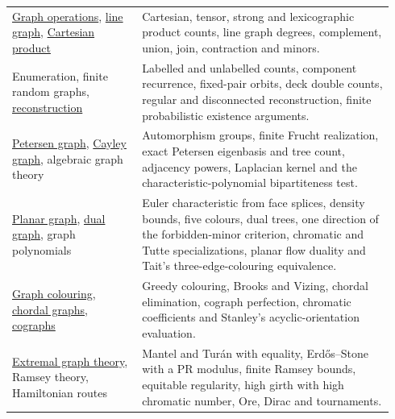 \begin{longtable}{@{} >{\raggedright\arraybackslash}p{0.32\linewidth}@{\hspace{0.04\linewidth}}p{0.62\linewidth}@{}}
\href{https://en.wikipedia.org/wiki/Graph_operations}{Graph operations},
\href{https://en.wikipedia.org/wiki/Line_graph}{line graph},
\href{https://en.wikipedia.org/wiki/Cartesian_product_of_graphs}{Cartesian product}
& Cartesian, tensor, strong and lexicographic product counts, line graph degrees, complement, union, join, contraction and minors.\\[4pt]
Enumeration, finite random graphs,
\href{https://en.wikipedia.org/wiki/Reconstruction_conjecture}{reconstruction}
& Labelled and unlabelled counts, component recurrence, fixed-pair orbits, deck double counts, regular and disconnected reconstruction, finite probabilistic existence arguments.\\[4pt]
\href{https://en.wikipedia.org/wiki/Petersen_graph}{Petersen graph},
\href{https://en.wikipedia.org/wiki/Cayley_graph}{Cayley graph},
algebraic graph theory
& Automorphism groups, finite Frucht realization, exact Petersen eigenbasis and tree count, adjacency powers, Laplacian kernel and the characteristic-polynomial bipartiteness test.\\[4pt]
\href{https://en.wikipedia.org/wiki/Planar_graph}{Planar graph},
\href{https://en.wikipedia.org/wiki/Dual_graph}{dual graph},
graph polynomials
& Euler characteristic from face splices, density bounds, five colours, dual trees, one direction of the forbidden-minor criterion, chromatic and Tutte specializations, planar flow duality and Tait's three-edge-colouring equivalence.\\[4pt]
\href{https://en.wikipedia.org/wiki/Graph_coloring}{Graph colouring},
\href{https://en.wikipedia.org/wiki/Chordal_graph}{chordal graphs},
\href{https://en.wikipedia.org/wiki/Cograph}{cographs}
& Greedy colouring, Brooks and Vizing, chordal elimination, cograph perfection, chromatic coefficients and Stanley's acyclic-orientation evaluation.\\[4pt]
\href{https://en.wikipedia.org/wiki/Extremal_graph_theory}{Extremal graph theory},
Ramsey theory, Hamiltonian routes
& Mantel and Tur\'an with equality, Erd\H{o}s--Stone with a PR modulus, finite Ramsey bounds, equitable regularity, high girth with high chromatic number, Ore, Dirac and tournaments.\\
\bottomrule
\end{longtable}

